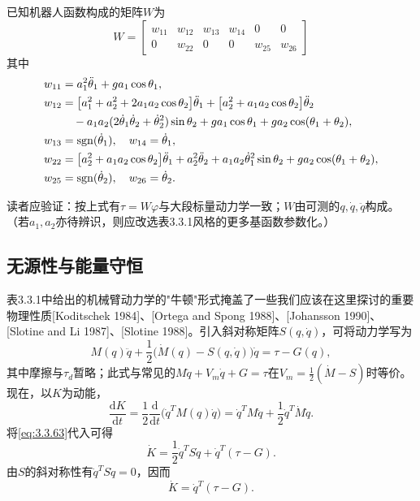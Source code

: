 \documentclass[12pt,a4paper]{ctexart}
\begin{document}
已知机器人函数构成的矩阵$W$为
\begin{equation}
W = \begin{bmatrix} w_{11} & w_{12} & w_{13} & w_{14} & 0 & 0 \\ 0 & w_{22} & 0 & 0 & w_{25} & w_{26} \end{bmatrix}
\end{equation}
其中
\begin{align}
w_{11} &= a_1^2\ddot{\theta}_1 + ga_1\cos\theta_1, \\
w_{12} &= \bigl[a_1^2 + a_2^2 + 2a_1a_2\cos\theta_2\bigr]\ddot{\theta}_1 + \bigl[a_2^2 + a_1a_2\cos\theta_2\bigr]\ddot{\theta}_2 \notag\\
 &\quad - a_1a_2(2\dot{\theta}_1\dot{\theta}_2 + \dot{\theta}_2^2)\sin\theta_2 + ga_1\cos\theta_1 + ga_2\cos(\theta_1+\theta_2), \\
w_{13} &= \mathrm{sgn}(\dot{\theta}_1), \quad w_{14} = \dot{\theta}_1, \\
w_{22} &= \bigl[a_2^2 + a_1a_2\cos\theta_2\bigr]\ddot{\theta}_1 + a_2^2\ddot{\theta}_2 + a_1a_2\dot{\theta}_1^2\sin\theta_2 + ga_2\cos(\theta_1+\theta_2), \\
w_{25} &= \mathrm{sgn}(\dot{\theta}_2), \quad w_{26} = \dot{\theta}_2.
\end{align}

读者应验证：按上式有$\tau = W\varphi$与大段标量动力学一致；$W$由可测的$q,\dot{q},\ddot{q}$构成。（若$a_1,a_2$亦待辨识，则应改选表3.3.1风格的更多基函数参数化。）

\subsection{无源性与能量守恒}

表3.3.1中给出的机械臂动力学的"牛顿"形式掩盖了一些我们应该在这里探讨的重要物理性质[Koditschek 1984]、[Ortega and Spong 1988]、[Johansson 1990]、[Slotine and Li 1987]、[Slotine 1988]。引入斜对称矩阵$S(q,\dot{q})$，可将动力学写为
\begin{equation}\label{eq:3.3.63}
M(q)\ddot{q} + \frac{1}{2}\bigl(\dot{M}(q) - S(q,\dot{q})\bigr)\dot{q} = \tau - G(q),
\end{equation}
其中摩擦与$\tau_d$暂略；此式与常见的$M\ddot{q}+V_m\dot{q}+G=\tau$在$V_m=\frac{1}{2}(\dot{M}-S)$时等价。现在，以$K$为动能，
\begin{equation}
\frac{\mathrm{d}K}{\mathrm{d}t} = \frac{1}{2}\frac{\mathrm{d}}{\mathrm{d}t}\bigl(\dot{q}^T M(q)\dot{q}\bigr) = \dot{q}^T M\ddot{q} + \frac{1}{2}\dot{q}^T \dot{M}\dot{q}.
\end{equation}
将\eqref{eq:3.3.63}代入可得
\begin{equation}\label{eq:3.3.64}
\dot{K} = \frac{1}{2}\dot{q}^T S\dot{q} + \dot{q}^T(\tau - G).
\end{equation}
由$S$的斜对称性有$\dot{q}^T S\dot{q}=0$，因而
\begin{equation}\label{eq:3.3.65}
\dot{K} = \dot{q}^T(\tau - G).
\end{equation}
\end{document}
